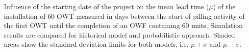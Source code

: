 \label{fig:comparison}
Influence of the starting date of the project on the mean lead time ($\mu$) of the installation of 60 OWT measured in days between the start of pilling activity of the first OWT until the completion of an OWF containing 60 units. Simulation results are compared for historical model and probabilistic approach. Shaded areas show the standard deviation limits for both models, i.e. $\mu + \sigma$ and $\mu - \sigma$. 